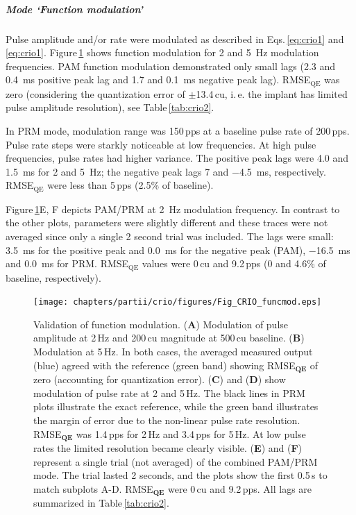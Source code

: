 \subparagraph{Mode ‘Function modulation’}
Pulse amplitude and/or rate were modulated as described in Eqs.\,\eqref{eq:crio1} and \eqref{eq:crio1}. Figure\,\ref{fig:crio:funcmod} shows function modulation for 2 and \SI{5}{\hertz} modulation frequencies. PAM function modulation demonstrated only small lags (2.3 and \SI{0.4}{\milli\second} positive peak lag and 1.7 and \SI{0.1}{\milli\second} negative peak lag). RMSE$_{\text{QE}}$ was zero (considering the quantization error of $\pm$13.4\,cu, i.\,e. the implant has limited pulse amplitude resolution), see Table\,\ref{tab:crio2}. 

In PRM mode, modulation range was 150\,pps at a baseline pulse rate of 200\,pps. Pulse rate steps were starkly noticeable at low frequencies. At high pulse frequencies, pulse rates had higher variance. The positive peak lags were 4.0 and \SI{1.5}{\milli\second} for 2 and \SI{5}{\hertz}; the negative peak lags 7 and \SI{-4.5}{\milli\second}, respectively. RMSE$_{\text{QE}}$ were less than 5\,pps (2.5\% of baseline). 

Figure\,\ref{fig:crio:funcmod}E, F depicts PAM/PRM at \SI{2}{\hertz} modulation frequency. In contrast to the other plots, parameters were slightly different and these traces were not averaged since only a single 2 second trial was included. The lags were small: \SI{3.5}{\milli\second} for the positive peak and \SI{0.0}{\milli\second} for the negative peak (PAM), \SI{-16.5}{\milli\second} and \SI{0.0}{\milli\second} for PRM. RMSE$_{\text{QE}}$ values were 0\,cu and 9.2\,pps (0 and 4.6\% of baseline, respectively).

\begin{figure}[btp]
\centering
\texttt{[image: chapters/partii/crio/figures/Fig\_CRIO\_funcmod.eps]} 
\caption[CompactRIO function modulation]{Validation of function modulation. (\textbf{A}) Modulation of pulse amplitude at 2\,Hz and 200\,cu magnitude at 500\,cu baseline. (\textbf{B}) Modulation at 5\,Hz. In both cases, the averaged measured output (blue) agreed with the reference (green band) showing RMSE$_{\textbf{QE}}$ of zero (accounting for quantization error). (\textbf{C}) and (\textbf{D}) show modulation of pulse rate at 2 and 5\,Hz. The black lines in PRM plots illustrate the exact reference, while the green band illustrates the margin of error due to the non-linear pulse rate resolution. RMSE$_{\textbf{QE}}$ was 1.4\,pps for 2\,Hz and 3.4\,pps for 5\,Hz. At low pulse rates the limited resolution became clearly visible. (\textbf{E}) and (\textbf{F}) represent a single trial (not averaged) of the combined PAM/PRM mode. The trial lasted 2 seconds, and the plots show the first 0.5\,s to match subplots A-D. RMSE$_{\textbf{QE}}$ were 0\,cu and 9.2\,pps. All lags are summarized in Table\,\ref{tab:crio2}.}
\label{fig:crio:funcmod}
\end{figure}

